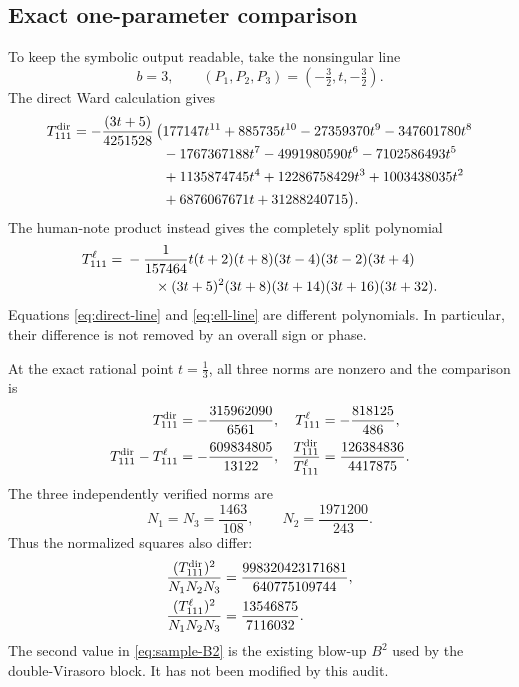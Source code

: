 \documentclass[11pt]{article}
\begin{document}
\subsection{Exact one-parameter comparison}

To keep the symbolic output readable, take the nonsingular line
\begin{equation}
 b=3,\qquad (P_1,P_2,P_3)=(-\tfrac32,t,-\tfrac32).
 \label{eq:compact-line}
\end{equation}
The direct Ward calculation gives
\begin{equation}
T_{111}^{\rm dir}
=-\frac{(3t+5)}{4251528}\,
\begin{aligned}[t]
\big(&177147t^{11}+885735t^{10}-27359370t^9-347601780t^8\\
&-1767367188t^7-4991980590t^6-7102586493t^5\\
&+1135874745t^4+12286758429t^3+1003438035t^2\\
&+6876067671t+31288240715\big).
\end{aligned}
\label{eq:direct-line}
\end{equation}
The human-note product instead gives the completely split polynomial
\begin{align}
T_{111}^{\ell}
={}&-\frac{1}{157464}
t(t+2)(t+8)(3t-4)(3t-2)(3t+4)\notag\\
&\qquad\times(3t+5)^2(3t+8)(3t+14)(3t+16)(3t+32).
\label{eq:ell-line}
\end{align}
Equations \eqref{eq:direct-line} and \eqref{eq:ell-line} are different
polynomials.  In particular, their difference is not removed by an overall
sign or phase.

At the exact rational point \(t=\frac13\), all three norms are nonzero and
the comparison is
\begin{align}
T_{111}^{\rm dir}&=-\frac{315962090}{6561},&
T_{111}^{\ell}&=-\frac{818125}{486},\\
T_{111}^{\rm dir}-T_{111}^{\ell}
&=-\frac{609834805}{13122},&
\frac{T_{111}^{\rm dir}}{T_{111}^{\ell}}
&=\frac{126384836}{4417875}.
\label{eq:sample-rho}
\end{align}
The three independently verified norms are
\begin{equation}
 N_1=N_3=\frac{1463}{108},\qquad
 N_2=\frac{1971200}{243}.
\end{equation}
Thus the normalized squares also differ:
\begin{align}
\frac{(T_{111}^{\rm dir})^2}{N_1N_2N_3}
&=\frac{998320423171681}{640775109744},\\
\frac{(T_{111}^{\ell})^2}{N_1N_2N_3}
&=\frac{13546875}{7116032}.
 \label{eq:sample-B2}
\end{align}
The second value in \eqref{eq:sample-B2} is the existing blow-up \(B^2\)
used by the double-Virasoro block.  It has not been modified by this audit.
\end{document}
